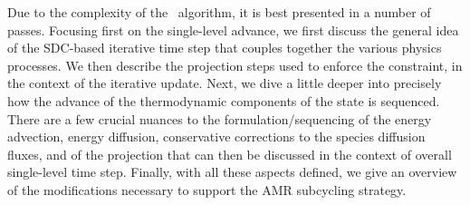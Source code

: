 Due to the complexity of the \pelelm\ algorithm, it is best presented in a number of passes.  Focusing first on the single-level advance, we first discuss the general idea of the SDC-based iterative time step that couples together the various physics processes.  We then describe the projection steps used to enforce the constraint, in the context of the iterative update.  Next, we dive a little deeper into precisely how the advance of the thermodynamic components of the state is sequenced.  There are a few crucial nuances to the formulation/sequencing of the energy advection, energy diffusion, conservative corrections to the species diffusion fluxes, and of the projection that can then be discussed in the context of overall single-level time step.  Finally, with all these aspects defined, we give an overview of the modifications necessary to support the AMR subcycling strategy.

